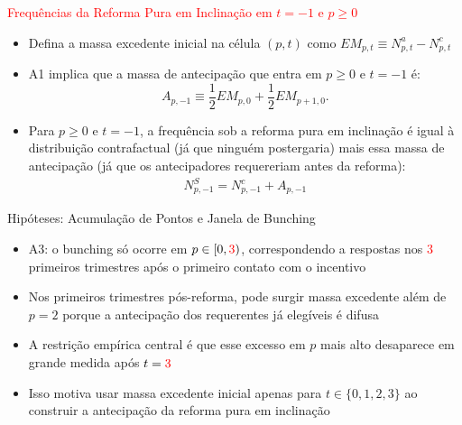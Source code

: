 \begin{frame}{\textcolor{red}{Frequências da Reforma Pura em Inclinação em $t=-1$ e $p\geq 0$}}
    \begin{itemize}
        \item Defina a massa excedente inicial na célula $(p,t)$ como $EM_{p,t}\equiv N^a_{p,t}-N^c_{p,t}$
        \item A1 implica que a massa de antecipação que entra em $p\geq 0$ e $t=-1$ é:
        \[
        A_{p,-1}\equiv \frac12 EM_{p,0}+\frac12 EM_{p+1,0}.
        \]
        \item Para $p\geq 0$ e $t=-1$, a frequência sob a reforma pura em inclinação é igual à distribuição contrafactual (já que ninguém postergaria) mais essa massa de antecipação (já que os antecipadores requereriam antes da reforma):
        \begin{align*}
            N^S_{p,-1}=N^c_{p,-1}+A_{p,-1}
        \end{align*}
    \end{itemize}
\end{frame}

\begin{frame}{Hipóteses: Acumulação de Pontos e Janela de Bunching}
\begin{itemize}
    \item A3: o bunching só ocorre em $p\in[0,\textcolor{red}{3})$, correspondendo a respostas nos \textcolor{red}{3} primeiros trimestres após o primeiro contato com o incentivo
    \item Nos primeiros trimestres pós-reforma, pode surgir massa excedente além de $p=2$ porque a antecipação dos requerentes já elegíveis é difusa
    \item A restrição empírica central é que esse excesso em $p$ mais alto desaparece em grande medida após $t=\textcolor{red}{3}$
    \item Isso motiva usar massa excedente inicial apenas para $t\in\{0,1,2,3\}$ ao construir a antecipação da reforma pura em inclinação
\end{itemize}
\end{frame}


